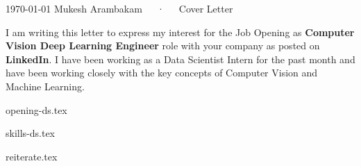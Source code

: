 \documentclass[11pt, a4paper]{awesome-cv}
\newcommand*{\sectiondir}{coverletter/}
\newcommand{\role}{Computer Vision Deep Learning Engineer}
\newcommand{\type}{Job Opening}
\newcommand{\postedloc}{LinkedIn}
\begin{document}
\makecvheader[R]

\makecvfooter
  {\today}
  {Mukesh Arambakam~~~·~~~Cover Letter}
  {}

\makelettertitle

\begin{cvletter}

I am writing this letter to express my interest for the {\type} as \textbf{\role} role with your company as posted on \textbf{\postedloc}.
I have been working as a Data Scientist Intern for the past month and have been working closely with the key concepts of Computer Vision and Machine Learning.

{opening-ds.tex}

{skills-ds.tex}

{reiterate.tex}




\end{cvletter}


\makeletterclosing
\end{document}
